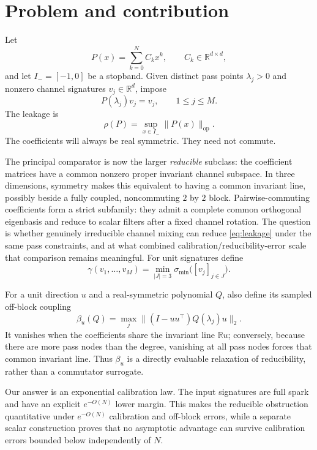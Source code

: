 \documentclass[11pt]{article}
\theoremstyle{remark}
\newcommand{\R}{\mathbb{R}}
\newcommand{\op}{\mathrm{op}}
\begin{document}
\section{Problem and contribution}

Let
\[
  P(x)=\sum_{k=0}^{N} C_k x^k, \qquad C_k\in\R^{d\times d},
\]
and let $I_-=[-1,0]$ be a stopband.  Given distinct pass points
$\lambda_j>0$ and nonzero channel signatures $v_j\in\R^d$, impose
\begin{equation}\label{eq:tangential}
  P(\lambda_j)v_j=v_j,\qquad 1\le j\le M.
\end{equation}
The leakage is
\begin{equation}\label{eq:leakage}
  \rho(P)=\sup_{x\in I_-}\|P(x)\|_{\op}.
\end{equation}
The coefficients will always be real symmetric.  They need not commute.

The principal comparator is now the larger \emph{reducible} subclass: the
coefficient matrices have a common nonzero proper invariant channel subspace.
In three dimensions, symmetry makes this equivalent to having a common
invariant line, possibly beside a fully coupled, noncommuting $2$ by $2$ block.
Pairwise-commuting coefficients form a strict subfamily: they admit a complete
common orthogonal eigenbasis and reduce to scalar filters after a fixed channel
rotation.  The question is whether genuinely irreducible channel mixing can
reduce \eqref{eq:leakage} under the same pass constraints, and at what combined
calibration/reducibility-error scale that comparison remains meaningful.  For
unit signatures define
\[
 \gamma(v_1,\ldots,v_M)
 =\min_{|J|=3}\sigma_{\min}\bigl([v_j]_{j\in J}\bigr).
\]

For a unit direction $u$ and a real-symmetric polynomial $Q$, also define its
sampled off-block coupling
\begin{equation}\label{eq:betadef}
 \beta_u(Q)=\max_j\|(I-uu^\top)Q(\lambda_j)u\|_2.
\end{equation}
It vanishes when the coefficients share the invariant line $\R u$; conversely,
because there are more pass nodes than the degree, vanishing at all pass nodes
forces that common invariant line.  Thus $\beta_u$ is a directly evaluable
relaxation of reducibility, rather than a commutator surrogate.

Our answer is an exponential calibration law.  The input signatures are full
spark and have an explicit $e^{-O(N)}$ lower margin.  This makes the reducible
obstruction quantitative under $e^{-O(N)}$ calibration and off-block errors,
while a separate scalar construction proves that no asymptotic advantage can
survive calibration errors bounded below independently of $N$.
\end{document}
